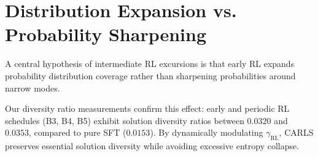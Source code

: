 \section{Distribution Expansion vs. Probability Sharpening}
\label{sec:expansion_vs_sharpening}

A central hypothesis of intermediate RL excursions is that early RL expands probability distribution coverage rather than sharpening probabilities around narrow modes.

Our diversity ratio measurements confirm this effect: early and periodic RL schedules (B3, B4, B5) exhibit solution diversity ratios between $0.0320$ and $0.0353$, compared to pure SFT ($0.0153$). By dynamically modulating $\gamma_{\text{RL}}$, CARLS preserves essential solution diversity while avoiding excessive entropy collapse.
